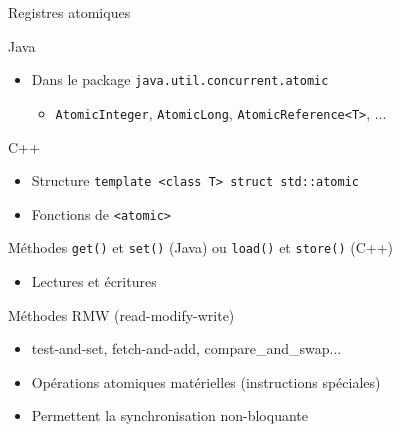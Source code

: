 
\begingroup

\begin{frame}[fragile]{Registres atomiques}
  \vspace{-2mm}
  \begin{exampleblock}{Java}
  \begin{itemize}
    \item Dans le package \lstinline{java.util.concurrent.atomic}
  \begin{itemize}
    \item \lstinline{AtomicInteger}, \lstinline{AtomicLong}, \lstinline{AtomicReference<T>}, ...
  \end{itemize}
  \end{itemize}
  \end{exampleblock}
  \vspace{-2mm}
  \begin{exampleblock}{C++}
  \begin{itemize}
    \item Structure \lstinline{template <class T> struct std::atomic} 
    \item Fonctions de \lstinline{<atomic>}
  \end{itemize}
 \end{exampleblock}
  \begin{alertblock}{Méthodes \lstinline{get()} et \lstinline{set()} (Java) ou \lstinline{load()} et \lstinline{store()} (C++)}
  \begin{itemize}
    \item Lectures et écritures 
  \end{itemize}
  \end{alertblock}
  \begin{block}{Méthodes RMW (read-modify-write)}
    \begin{itemize}
    \item test-and-set, fetch-and-add, compare\_and\_swap...
    \item Opérations atomiques matérielles (instructions spéciales)
    \item Permettent la synchronisation non-bloquante
    \end{itemize}
  \end{block}
\end{frame}

\endgroup
\endinput
